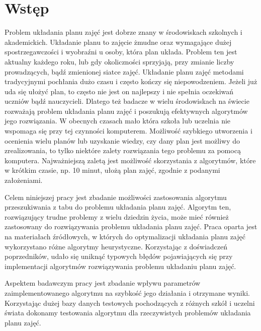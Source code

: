 \chapter{Wstęp}


Problem układania planu zajęć jest dobrze znany w środowiskach szkolnych i akademickich. Układanie planu to zajęcie żmudne oraz wymagające dużej spostrzegawczości i wyobraźni u osoby, która plan układa. Problem ten jest aktualny każdego roku, lub gdy okoliczności sprzyjają, przy zmianie liczby prowadzących, bądź zmienionej siatce zajęć. Układanie planu zajęć metodami tradycyjnymi pochłania dużo czasu i często kończy się niepowodzeniem. Jeżeli już uda się ułożyć plan, to często nie jest on najlepszy i nie spełnia oczekiwań uczniów bądź nauczycieli. Dlatego też badacze w wielu środowiskach na świecie rozważają problem układania planu zajęć i poszukują efektywnych algorytmów jego rozwiązania. W obecnych czasach mało która szkoła lub uczelnia nie wspomaga się przy tej czynności komputerem. Możliwość szybkiego utworzenia i ocenienia wielu planów lub uzyskanie wiedzy, czy dany plan jest możliwy do zrealizowania, to tylko niektóre zalety rozwiązania tego problemu za pomocą komputera. Najważniejszą zaletą jest możliwość skorzystania z algorytmów, które w krótkim czasie, np. 10 minut, ułożą plan zajęć, zgodnie z podanymi założeniami.

Celem niniejszej pracy jest zbadanie możliwości zastosowania algorytmu przeszukiwania z tabu do problemu układania planu zajęć. Algorytm ten, rozwiązujący trudne problemy z wielu dziedzin życia, może mieć również zastosowany do rozwiązywania problemu układania planu zajęć. Praca oparta jest na materiałach źródłowych, w których do optymalizacji układania planu zajęć wykorzystano różne algorytmy heurystyczne. Korzystając z doświadczeń poprzedników, udało się uniknąć typowych błędów pojawiających się przy implementacji algorytmów rozwiązywania problemu układaniu planu zajęć.

Aspektem badawczym pracy jest zbadanie wpływu parametrów zaimplementowanego algorytmu na szybkość jego działania i otrzymane wyniki. Korzystając dużej bazy danych testowych pochodzących z różnych szkół i uczelni świata dokonamy testowania algorytmu dla rzeczywistych problemów układania planu zajęć.

